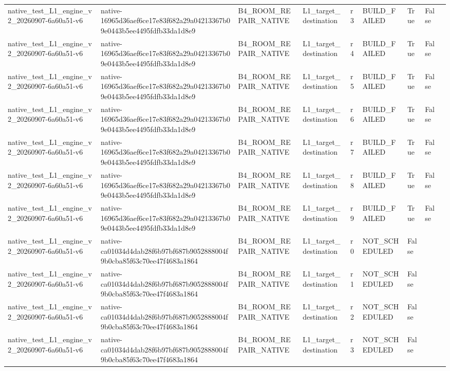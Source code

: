 \begin{tabular}{lllllllll}
native\_test\_L1\_engine\_v2\_20260907-6a60a51-v6 & native-16965d36aef6ce17e83f682a29a04213367b09e0443b5ee4495fdfb33da1d8e9 & B4\_ROOM\_REPAIR\_NATIVE & L1\_target\_destination & r3 & BUILD\_FAILED & True & False &  \\
native\_test\_L1\_engine\_v2\_20260907-6a60a51-v6 & native-16965d36aef6ce17e83f682a29a04213367b09e0443b5ee4495fdfb33da1d8e9 & B4\_ROOM\_REPAIR\_NATIVE & L1\_target\_destination & r4 & BUILD\_FAILED & True & False &  \\
native\_test\_L1\_engine\_v2\_20260907-6a60a51-v6 & native-16965d36aef6ce17e83f682a29a04213367b09e0443b5ee4495fdfb33da1d8e9 & B4\_ROOM\_REPAIR\_NATIVE & L1\_target\_destination & r5 & BUILD\_FAILED & True & False &  \\
native\_test\_L1\_engine\_v2\_20260907-6a60a51-v6 & native-16965d36aef6ce17e83f682a29a04213367b09e0443b5ee4495fdfb33da1d8e9 & B4\_ROOM\_REPAIR\_NATIVE & L1\_target\_destination & r6 & BUILD\_FAILED & True & False &  \\
native\_test\_L1\_engine\_v2\_20260907-6a60a51-v6 & native-16965d36aef6ce17e83f682a29a04213367b09e0443b5ee4495fdfb33da1d8e9 & B4\_ROOM\_REPAIR\_NATIVE & L1\_target\_destination & r7 & BUILD\_FAILED & True & False &  \\
native\_test\_L1\_engine\_v2\_20260907-6a60a51-v6 & native-16965d36aef6ce17e83f682a29a04213367b09e0443b5ee4495fdfb33da1d8e9 & B4\_ROOM\_REPAIR\_NATIVE & L1\_target\_destination & r8 & BUILD\_FAILED & True & False &  \\
native\_test\_L1\_engine\_v2\_20260907-6a60a51-v6 & native-16965d36aef6ce17e83f682a29a04213367b09e0443b5ee4495fdfb33da1d8e9 & B4\_ROOM\_REPAIR\_NATIVE & L1\_target\_destination & r9 & BUILD\_FAILED & True & False &  \\
native\_test\_L1\_engine\_v2\_20260907-6a60a51-v6 & native-ca01034d4dab28f6b97bf687b9052888004f9b0cba85f63c70ee47f4683a1864 & B4\_ROOM\_REPAIR\_NATIVE & L1\_target\_destination & r0 & NOT\_SCHEDULED & False &  &  \\
native\_test\_L1\_engine\_v2\_20260907-6a60a51-v6 & native-ca01034d4dab28f6b97bf687b9052888004f9b0cba85f63c70ee47f4683a1864 & B4\_ROOM\_REPAIR\_NATIVE & L1\_target\_destination & r1 & NOT\_SCHEDULED & False &  &  \\
native\_test\_L1\_engine\_v2\_20260907-6a60a51-v6 & native-ca01034d4dab28f6b97bf687b9052888004f9b0cba85f63c70ee47f4683a1864 & B4\_ROOM\_REPAIR\_NATIVE & L1\_target\_destination & r2 & NOT\_SCHEDULED & False &  &  \\
native\_test\_L1\_engine\_v2\_20260907-6a60a51-v6 & native-ca01034d4dab28f6b97bf687b9052888004f9b0cba85f63c70ee47f4683a1864 & B4\_ROOM\_REPAIR\_NATIVE & L1\_target\_destination & r3 & NOT\_SCHEDULED & False &  &  \\

\end{tabular}
